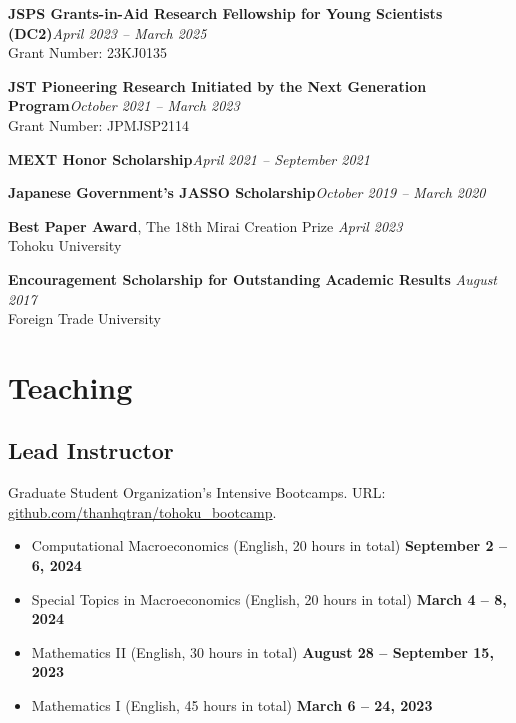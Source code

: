 \documentclass[12pt]{article}
\begin{document}
\textbf{JSPS Grants-in-Aid Research Fellowship for Young Scientists (DC2)}\hfill \emph{April 2023 -- March 2025}\\
Grant Number: 23KJ0135

\textbf{JST Pioneering Research Initiated by the Next Generation Program}\hfill \emph{October 2021 -- March 2023}\\
Grant Number: JPMJSP2114

\textbf{MEXT Honor Scholarship}\hfill \emph{April 2021 -- September 2021}

\textbf{Japanese Government's JASSO Scholarship}\hfill \emph{October 2019 -- March 2020}

\textbf{Best Paper Award}, The 18th Mirai Creation Prize \hfill \emph{April 2023}\\
Tohoku University

\textbf{Encouragement Scholarship for Outstanding Academic Results} \hfill \emph{August 2017}\\
Foreign Trade University

\section{Teaching}

\subsection{Lead Instructor}
Graduate Student Organization's Intensive Bootcamps. URL: \href{https://github.com/thanhqtran/tohoku_bootcamp}{github.com/thanhqtran/tohoku\_bootcamp}.
\begin{itemize}
	\item[ ] Computational Macroeconomics  (English, 20 hours in total) \hfill {\bf September 2 -- 6, 2024}
	\item[ ] Special Topics in Macroeconomics (English, 20 hours in total) \hfill {\bf March 4 -- 8, 2024}
	\item[ ] Mathematics II (English, 30 hours in total)  \hfill {\bf August 28 -- September 15, 2023}
	\item[ ] Mathematics I  (English, 45 hours in total)  \hfill {\bf March 6 -- 24, 2023}
\end{itemize}
\end{document}
